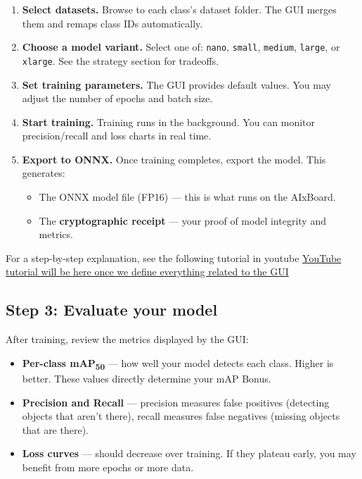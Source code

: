 \documentclass[a4]{article}
\begin{document}
\begin{enumerate}
    \item \textbf{Select datasets.} Browse to each class's dataset folder. The GUI merges them and remaps class IDs automatically.
    \item \textbf{Choose a model variant.} Select one of: \texttt{nano}, \texttt{small}, \texttt{medium}, \texttt{large}, or \texttt{xlarge}. See the strategy section for tradeoffs.
    \item \textbf{Set training parameters.} The GUI provides default values. You may adjust the number of epochs and batch size.
    \item \textbf{Start training.} Training runs in the background. You can monitor precision/recall and loss charts in real time.
    \item \textbf{Export to ONNX.} Once training completes, export the model. This generates:
    \begin{itemize}
        \item The ONNX model file (FP16) --- this is what runs on the AIxBoard.
        \item The \textbf{cryptographic receipt} --- your proof of model integrity and metrics.
    \end{itemize}
\end{enumerate}

For a step-by-step explanation, see the following tutorial in youtube \href{http}{YouTube tutorial will be here once we define everything related to the GUI}

\subsection*{Step 3: Evaluate your model}

After training, review the metrics displayed by the GUI:
\begin{itemize}
    \item \textbf{Per-class mAP\textsubscript{50}} --- how well your model detects each class. Higher is better. These values directly determine your mAP Bonus.
    \item \textbf{Precision and Recall} --- precision measures false positives (detecting objects that aren't there), recall measures false negatives (missing objects that are there).
    \item \textbf{Loss curves} --- should decrease over training. If they plateau early, you may benefit from more epochs or more data.
\end{itemize}
\end{document}
